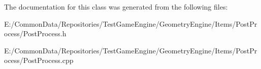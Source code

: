 The documentation for this class was generated from the following files\+:\begin{DoxyCompactItemize}
\item 
E\+:/\+Common\+Data/\+Repositories/\+Test\+Game\+Engine/\+Geometry\+Engine/\+Items/\+Post\+Process/Post\+Process.\+h\item 
E\+:/\+Common\+Data/\+Repositories/\+Test\+Game\+Engine/\+Geometry\+Engine/\+Items/\+Post\+Process/Post\+Process.\+cpp\end{DoxyCompactItemize}
